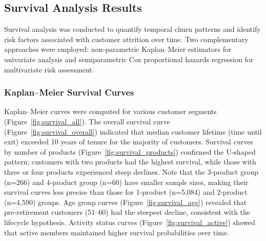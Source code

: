\documentclass[12pt]{article}
\begin{document}
\subsection{Survival Analysis Results}
Survival analysis was conducted to quantify temporal churn patterns and identify risk factors associated with customer attrition over time. Two complementary approaches were employed: non-parametric Kaplan–Meier estimators for univariate analysis and semiparametric Cox proportional hazards regression for multivariate risk assessment.

\subsubsection{Kaplan–Meier Survival Curves}
Kaplan–Meier curves were computed for various customer segments (Figure~\ref{fig:survival_all}). The overall survival curve (Figure~\ref{fig:survival_overall}) indicated that median customer lifetime (time until exit) exceeded 10 years of tenure for the majority of customers. Survival curves by number of products (Figure~\ref{fig:survival_products}) confirmed the U‑shaped pattern; customers with two products had the highest survival, while those with three or four products experienced steep declines. Note that the 3‑product group (n=266) and 4‑product group (n=60) have smaller sample sizes, making their survival curves less precise than those for 1‑product (n=5,084) and 2‑product (n=4,590) groups. Age group curves (Figure~\ref{fig:survival_age}) revealed that pre‑retirement customers (51–60) had the steepest decline, consistent with the lifecycle hypothesis. Activity status curves (Figure~\ref{fig:survival_active}) showed that active members maintained higher survival probabilities over time.
\end{document}
